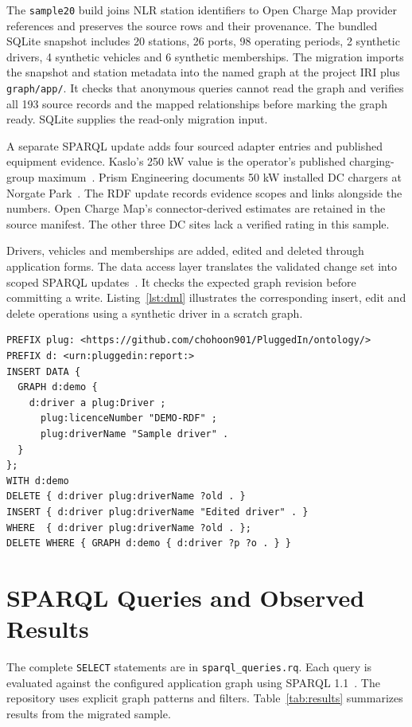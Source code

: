 \documentclass[sigconf,nonacm]{acmart}
\begin{document}
The \texttt{sample20} build joins NLR station identifiers to Open Charge Map provider references and preserves the source rows and their provenance. The bundled SQLite snapshot includes 20 stations, 26 ports, 98 operating periods, 2 synthetic drivers, 4 synthetic vehicles and 6 synthetic memberships. The migration imports the snapshot and station metadata into the named graph at the project IRI plus \texttt{graph/app/}. It checks that anonymous queries cannot read the graph and verifies all 193 source records and the mapped relationships before marking the graph ready. SQLite supplies the read-only migration input.

A separate SPARQL update adds four sourced adapter entries and published equipment evidence. Kaslo's 250 kW value is the operator's published charging-group maximum~\cite{tesla}. Prism Engineering documents 50 kW installed DC chargers at Norgate Park~\cite{prism}. The RDF update records evidence scopes and links alongside the numbers. Open Charge Map's connector-derived estimates are retained in the source manifest. The other three DC sites lack a verified rating in this sample.

Drivers, vehicles and memberships are added, edited and deleted through application forms. The data access layer translates the validated change set into scoped SPARQL updates~\cite{update}. It checks the expected graph revision before committing a write. Listing~\ref{lst:dml} illustrates the corresponding insert, edit and delete operations using a synthetic driver in a scratch graph.

\begin{lstlisting}[caption={SPARQL write example for a scratch graph.},label={lst:dml}]
PREFIX plug: <https://github.com/chohoon901/PluggedIn/ontology/>
PREFIX d: <urn:pluggedin:report:>
INSERT DATA {
  GRAPH d:demo {
    d:driver a plug:Driver ;
      plug:licenceNumber "DEMO-RDF" ;
      plug:driverName "Sample driver" .
  }
};
WITH d:demo
DELETE { d:driver plug:driverName ?old . }
INSERT { d:driver plug:driverName "Edited driver" . }
WHERE  { d:driver plug:driverName ?old . };
DELETE WHERE { GRAPH d:demo { d:driver ?p ?o . } }
\end{lstlisting}

\section{SPARQL Queries and Observed Results}

The complete \texttt{SELECT} statements are in \texttt{sparql\_queries.rq}. Each query is evaluated against the configured application graph using SPARQL 1.1~\cite{query}. The repository uses explicit graph patterns and filters. Table~\ref{tab:results} summarizes results from the migrated sample.
\end{document}
